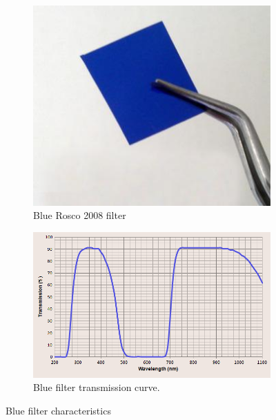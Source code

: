 \begin{figure}[H]
\begin{subfigure}{0.5\textwidth}
\centering
\includegraphics[scale=0.45]{images/blue_filter.jpg}
\caption{Blue Rosco 2008 filter \cite{blue_filter}}
\label{fig:blue_filter}
\end{subfigure}
\begin{subfigure}{0.5\textwidth}
\centering
\includegraphics[scale=0.42]{images/superblueinfraredfiltercurve.png}
\caption{Blue filter transmission curve.}
\label{fig:blue_curve}
\end{subfigure}
\caption{Blue filter characteristics \cite{blue_curve}}
\label{fig:blue_character}
\end{figure}

%	
%
%	
%
%

